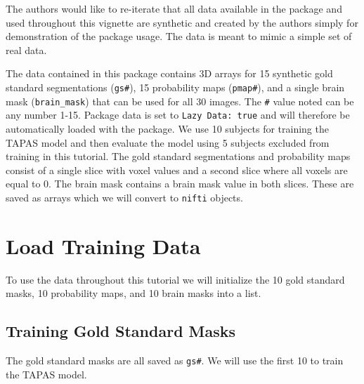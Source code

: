 \documentclass[]{article}
\begin{document}
The authors would like to re-iterate that all data available in the
package and used throughout this vignette are synthetic and created by
the authors simply for demonstration of the package usage. The data is
meant to mimic a simple set of real data.

The data contained in this package contains 3D arrays for 15 synthetic
gold standard segmentations (\texttt{gs\#}), 15 probability maps
(\texttt{pmap\#}), and a single brain mask (\texttt{brain\_mask}) that
can be used for all 30 images. The \texttt{\#} value noted can be any
number 1-15. Package data is set to \texttt{Lazy\ Data:\ true} and will
therefore be automatically loaded with the package. We use 10 subjects
for training the TAPAS model and then evaluate the model using 5
subjects excluded from training in this tutorial. The gold standard
segmentations and probability maps consist of a single slice with voxel
values and a second slice where all voxels are equal to 0. The brain
mask contains a brain mask value in both slices. These are saved as
arrays which we will convert to \texttt{nifti} objects.

\hypertarget{load-training-data}{%
\section{Load Training Data}\label{load-training-data}}

To use the data throughout this tutorial we will initialize the 10 gold
standard masks, 10 probability maps, and 10 brain masks into a list.

\hypertarget{training-gold-standard-masks}{%
\subsection{Training Gold Standard
Masks}\label{training-gold-standard-masks}}

The gold standard masks are all saved as \texttt{gs\#}. We will use the
first 10 to train the TAPAS model.
\end{document}

